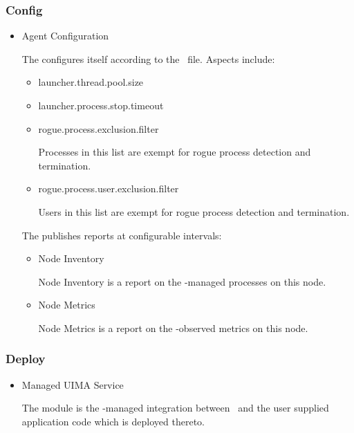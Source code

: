     \subsubsection{Config}     
    
    \begin{itemize}
      \item Agent Configuration
      
      The \varAgent configures itself according to the 
      \varDuccProperties~file.  Aspects include:
      
      \begin{itemize}
        \item launcher.thread.pool.size
        \item launcher.process.stop.timeout
        \item rogue.process.exclusion.filter
        
        Processes in this list are exempt for rogue process detection
        and termination.
        
        \item rogue.process.user.exclusion.filter
        
        Users in this list are exempt for rogue process detection
        and termination.
        
      \end{itemize} 
      
      The \varAgent publishes reports at configurable intervals:
      
      \begin{itemize}
        \item Node Inventory
        
        Node Inventory is a report on the \varAgent-managed processes
        on this node.
        
        \item Node Metrics
        
        Node Metrics is a report on the \varAgent-observed metrics
        on this node.
        
      \end{itemize} 
      
    \end{itemize}  
            
    \subsubsection{Deploy}
    
    \begin{itemize}
      \item Managed UIMA Service
      
      The module is the \varAgent-managed integration between
      \varUIMAAS~and the user supplied application code which is
      deployed thereto.
      
    \end{itemize}    
    
